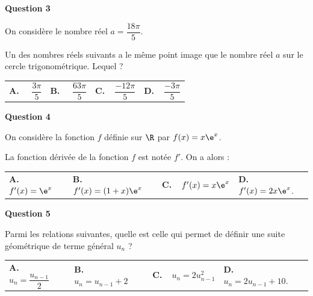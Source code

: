 \medskip

\textbf{Question 3}

\medskip

On considère le nombre réel $a = \dfrac{18\pi}{5}$.


Un des nombres réels suivants a le même point image que le nombre réel $a$ sur le cercle
trigonométrique. Lequel ?

\medskip

\begin{tabularx}{\linewidth}{*{4}{X}}
\textbf{A.~~} $\dfrac{3\pi}{5}$ &\textbf{B.~~} $\dfrac{63\pi}{5}$&\textbf{C.~~}$\dfrac{-12\pi}{5}$& \textbf{D.~~}$\dfrac{-3\pi}{5}$
\end{tabularx}


\medskip

\textbf{Question 4}

\medskip

On considère la fonction $f$ définie sur $\R$ par $f(x) = x\e^x$.

La fonction dérivée de la fonction $f$ est notée $f'$. On a alors :

\medskip

\begin{tabularx}{\linewidth}{*{4}{X}}
\textbf{A.~~} $f'(x) = \e^x$ &\textbf{B.~~} $f'(x) = (1 + x)\e ^x $&\textbf{C.~~}$f'(x) = x\e^x$& \textbf{D.~~} $f'(x) = 2x\e^x$.
\end{tabularx}

\medskip

\textbf{Question 5}

\medskip

Parmi les relations suivantes, quelle est celle qui permet de définir une suite géométrique de
terme général $u_n$ ?

\medskip

\begin{tabularx}{\linewidth}{*{4}{X}}
\textbf{A.~~} $u_n =\dfrac{u_{n-1}}{2}$ &\textbf{B.~~} $u_n = u_{n-1} + 2$&\textbf{C.~~}$ u_ n = 2u_{ n-1}^2$& \textbf{D.~~} $u_n = 2u_{n-1} + 10$.
\end{tabularx}

\vspace{1cm}
